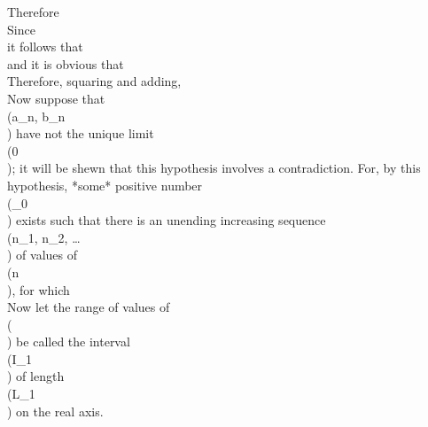 Therefore
\\[ 
\left| \, 
  \cos n\delta
  (a_{n} \cos nx + b_{n} \sin nx)
  +
  \sin n\delta
  (-a_{n} \sin nx + b_{n} \cos nx)
 \, \right| 
<
\eps.
\\] 

Since
\\[ 
\left| \, 
  \cos n\delta
  (a_{n} \cos nx + b_{n} \sin nx)
 \, \right| 
<
\eps,
\\] 
it follows that
\\[ 
\left| \, 
  \sin n\delta
  (-a_{n} \sin nx + b_{n} \cos nx)
 \, \right| 
<
2\eps,
\\] 
and it is obvious that
\\[ 
\left| \, 
  \sin n\delta
  (a_{n} \sin nx + b_{n} \cos nx)
 \, \right| 
<
2\eps.
\\] 

Therefore, squaring and adding,
\\[ 
\sqrt{a_{n}^{2} + b_{n}^{2}}
\left| \,  \sin n\delta  \, \right| 
<
2\eps\sqrt{2}
\\] 

Now suppose that \\(a_{n}, b_{n}\\) have not the unique limit \\(0\\); it will be shewn
that this hypothesis involves a contradiction. For, by this
hypothesis, *some* positive number \\(\eps_{0}\\) exists such that there is an
unending increasing sequence \\(n_{1}, n_{2}, \ldots\\) of values of \\(n\\), for which
\\[ 
\sqrt{a_{n}^{2} + b_{n}^{2}} > 4\eps_{0}.
\\] 

Now let the range of values of \\(\delta\\) be called the interval \\(I_{1}\\) of length
\\(L_{1}\\) on the real axis.


